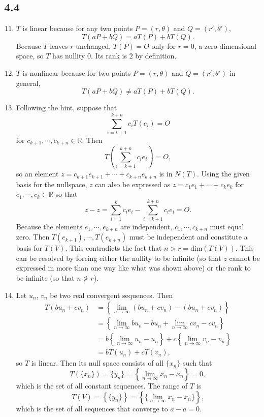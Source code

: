 \documentclass[a4paper,12pt]{article}
\begin{document}
	\subsection*{4.4}
	\begin{enumerate}
		\setcounter{enumi}{10}
		\item $T$ is linear because for any two points $P = (r, \theta)$ and $Q = (r', \theta')$,
		\[ T(aP + bQ) = aT(P) + bT(Q). \]
		Because $T$ leaves $r$ unchanged, $T(P) = O$ only for $r = 0$, a zero-dimensional space, so $T$ has nullity $0$. Its rank is $2$ by definition.
		
		\setcounter{enumi}{14}
		\item $T$ is nonlinear because for two points $P = (r, \theta)$ and $Q = (r', \theta')$ in general,
		\[ T(aP + bQ) \neq aT(P) + bT(Q). \]
		
		\setcounter{enumi}{23}
		\item Following the hint, suppose that
		\[ \sum_{i = k + 1}^{k + n}c_iT(e_i) = O \]
		for $c_{k + 1}, \cdots, c_{k + n} \in \mathbb{R}$. Then
		\[ T\left(\sum_{i = k + 1}^{k + n}c_ie_i\right) = O, \]
		so an element $z = c_{k + 1}e_{k + 1} + \cdots + c_{k + n}e_{k + n}$ is in $N(T)$. Using the given basis for the nullspace, $z$ can also be expressed as $z = c_1 e_1 + \cdots + c_k e_k$ for $c_1, \cdots, c_k \in \mathbb{R}$ so that
		\[ z - z = \sum_{i = 1}^{k}c_i e_i - \sum_{i = k + 1}^{k + n}c_i e_i = O.\]
		Because the elements $e_1, \cdots, e_{k + n}$ are independent, $c_1, \cdots, c_{k + n}$ must equal zero. Then $T(e_{k + 1}), \cdots, T(e_{k + n})$ must be independent and constitute a basis for $T(V)$. This contradicts the fact that $n > r = \mbox{dim}(T(V))$. This can be resolved by forcing either the nullity to be infinite (so that $z$ cannot be expressed in more than one way like what was shown above) or the rank to be infinite (so that $n \ngtr r$).

		\setcounter{enumi}{28}
		\item Let ${u_n}$, ${v_n}$ be two real convergent sequences. Then
		\begin{align*}
		T(b{u_n} + c{v_n}) &= \left\{\lim_{n \to \infty}(bu_n + cv_n) - (bu_n + cv_n)\right\} \\
		&= \left\{\lim_{n \to \infty}bu_n - bu_n + \lim_{n \to \infty}cv_n - cv_n\right\} \\
		&= b\left\{\lim_{n \to \infty}u_n - u_n\right\} + c\left\{\lim_{n \to \infty}v_n - v_n\right\} \\
		&= bT(u_n) + cT(v_n),
		\end{align*}
		so $T$ is linear. Then its null space consists of all $\{x_n\}$ such that
		\[ T(\{x_n\}) = \{y_n\} = \left\{\lim_{n \to \infty}x_n - x_n \right\} = 0, \]
		which is the set of all constant sequences. The range of $T$ is
		\[ T(V) = \left\{\{y_n\}\right\} = \left\{\{\lim_{n \to \infty}x_n - x_n\}\right\}, \]
		which is the set of all sequences that converge to $a - a = 0$.
	\end{enumerate}
	
\end{document}

